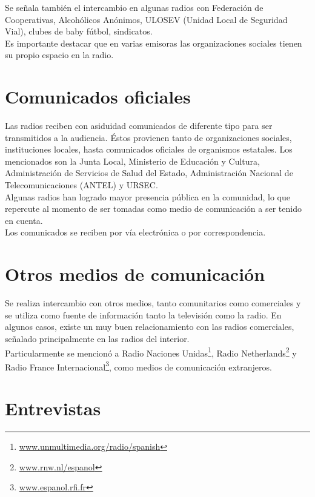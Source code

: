 Se señala también el intercambio en algunas radios con Federación de Cooperativas, Alcohólicos Anónimos, ULOSEV (Unidad Local de Seguridad Vial), clubes de baby fútbol, sindicatos.\\

Es importante destacar que en varias emisoras las organizaciones sociales tienen su propio espacio en la radio.\\

\section{Comunicados oficiales}

Las radios reciben con asiduidad comunicados de diferente tipo para ser transmitidos a la audiencia. Éstos provienen tanto de organizaciones sociales, instituciones locales, hasta comunicados oficiales de organismos estatales. Los mencionados son la Junta Local, Ministerio de Educación y Cultura, Administración de Servicios de Salud del Estado, Administración Nacional de Telecomunicaciones (ANTEL) y URSEC.\\

Algunas radios han logrado mayor presencia pública en la comunidad, lo que repercute al momento de ser tomadas como medio de comunicación a ser tenido en cuenta.\\

Los comunicados se reciben por vía electrónica o por correspondencia.\\

\section{Otros medios de comunicación}

Se realiza intercambio con otros medios, tanto comunitarios como comerciales y se utiliza como fuente de información tanto la televisión como la radio. En algunos casos, existe un muy buen relacionamiento con las radios comerciales, señalado principalmente en las radios del interior.\\

Particularmente se mencionó a Radio Naciones Unidas\footnote{\href{http://www.unmultimedia.org/radio/spanish}{www.unmultimedia.org/radio/spanish}}, Radio Netherlands\footnote{\href{http://www.rnw.nl/espanol}{www.rnw.nl/espanol}} y Radio France Internacional\footnote{\href{http://www.espanol.rfi.fr}{www.espanol.rfi.fr}}, como medios de comunicación extranjeros.

\section{Entrevistas}

